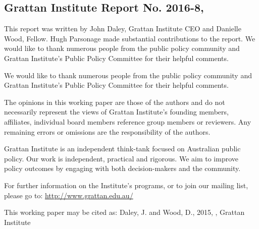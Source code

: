 \subsection*{Grattan Institute Report No. 2016-8, \the\month\ \the\year}
This report was written by John Daley, Grattan Institute CEO and Danielle Wood, Fellow. Hugh Parsonage made substantial contributions to the report.
We would like to thank numerous people from the public policy community and Grattan Institute’s Public Policy Committee for their helpful comments.

We would like to thank numerous people from the public policy community and
Grattan Institute's Public Policy Committee for their helpful comments.

The opinions in this working paper are those of the authors and do not
necessarily represent the views of Grattan Institute's founding members,
affiliates, individual board members reference group members or reviewers. Any
remaining errors or omissions are the responsibility of the authors.


Grattan Institute is an independent think-tank focused on Australian public
policy. Our work is independent, practical and rigorous. We aim to improve
policy outcomes by engaging with both decision-makers and the community. 

For further information on the Institute's programs, or to join our mailing list,
please go to: \url{http://www.grattan.edu.au/}

{\small
This working paper may be cited as: Daley, J. and Wood, D., 2015, \textit{\mytitle}, Grattan Institute 
}